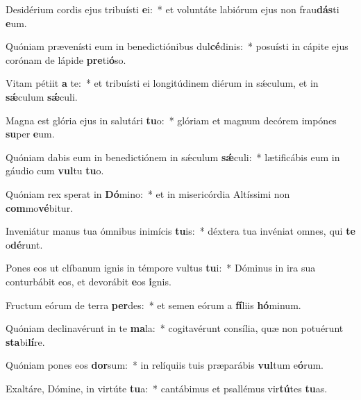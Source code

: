\item Desidérium cordis ejus tribuísti \textbf{e}i:~* et voluntáte labiórum ejus non frau\textbf{dás}ti \textbf{e}um.
\item Quóniam prævenísti eum in benedictiónibus dul\textbf{cé}dinis:~* posuísti in cápite ejus corónam de lápide \textbf{pre}ti\textbf{ó}so.
\item Vitam pétiit \textbf{a} te:~* et tribuísti ei longitúdinem diérum in sǽculum, et in \textbf{sǽ}culum \textbf{sǽ}culi.
\item Magna est glória ejus in salutári \textbf{tu}o:~* glóriam et magnum decórem impónes \textbf{su}per \textbf{e}um.
\item Quóniam dabis eum in benedictiónem in sǽculum \textbf{sǽ}culi:~* lætificábis eum in gáudio cum \textbf{vul}tu \textbf{tu}o.
\item Quóniam rex sperat in \textbf{Dó}mino:~* et in misericórdia Altíssimi non \textbf{com}mo\textbf{vé}bitur.
\item Inveniátur manus tua ómnibus inimícis \textbf{tu}is:~* déxtera tua invéniat omnes, qui \textbf{te} o\textbf{dé}runt.
\item Pones eos ut clíbanum ignis in témpore vultus \textbf{tu}i:~* Dóminus in ira sua conturbábit eos, et devorábit \textbf{e}os \textbf{i}gnis.
\item Fructum eórum de terra \textbf{per}des:~* et semen eórum a \textbf{fí}liis \textbf{hó}minum.
\item Quóniam declinavérunt in te \textbf{ma}la:~* cogitavérunt consília, quæ non potuérunt \textbf{sta}bi\textbf{lí}re.
\item Quóniam pones eos \textbf{dor}sum:~* in relíquiis tuis præparábis \textbf{vul}tum e\textbf{ó}rum.
\item Exaltáre, Dómine, in virtúte \textbf{tu}a:~* cantábimus et psallémus vir\textbf{tú}tes \textbf{tu}as.
